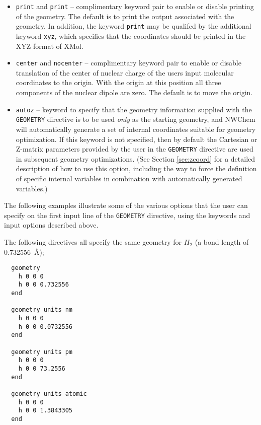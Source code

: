 \begin{itemize}
\item \verb+print+ and \verb+print+ -- complimentary keyword pair to
enable or disable printing of the geometry.  The default is to print   
the output associated with the geometry.  In addition, the keyword 
\verb+print+ may
be qualifed by the additional keyword \verb+xyz+, which specifies
that the coordinates should be printed in the XYZ format of XMol.

\item \verb+center+ and \verb+nocenter+ -- complimentary keyword pair
  to enable or disable translation of the center of nuclear charge of
  the users input molecular coordinates to the origin.  With the
  origin at this position all three components of the nuclear dipole
  are zero.  The default is to move the origin.

\item \verb+autoz+ -- keyword to specify that the geometry 
information supplied
with the \verb+GEOMETRY+ directive is to be used {\em only} as the starting
geometry, and NWChem will automatically generate a set of internal coordinates
suitable for geometry optimization.  If this keyword is not specified, then
by default the Cartesian or Z-matrix parameters provided by the user
in the \verb+GEOMETRY+ directive are used in subsequent geometry
optimizations. 
(See Section \ref{sec:zcoord} for a detailed description of how to
use this option, including the way to
force the definition of specific internal variables in combination
with automatically generated variables.)
\end{itemize}

The following examples illustrate some of the various options that the user
can specify on the first input line of the \verb+GEOMETRY+ directive, using
the keywords and input options described above.


The following directives all specify the same geometry for $H_2$
(a bond length of 0.732556\ \AA);
\begin{verbatim}
  geometry
    h 0 0 0
    h 0 0 0.732556
  end

  geometry units nm
    h 0 0 0
    h 0 0 0.0732556
  end

  geometry units pm
    h 0 0 0
    h 0 0 73.2556
  end

  geometry units atomic
    h 0 0 0
    h 0 0 1.3843305
  end
\end{verbatim}
      
